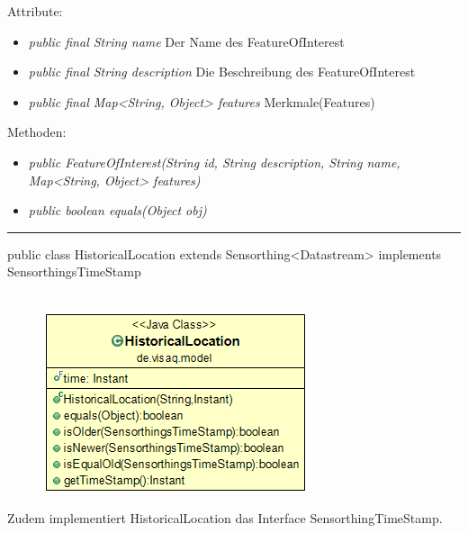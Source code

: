 Attribute:
\begin{itemize} 
	\item \emph{public final String name} Der Name des FeatureOfInterest
	\item \emph{public final String description} Die Beschreibung des FeatureOfInterest
	\item \emph{public final Map<String, Object> features} Merkmale(Features)
\end{itemize}
Methoden:
\begin{itemize} 
	\item \emph{public FeatureOfInterest(String id, String description, String name, Map<String, Object> features)} 
	\item \emph{public boolean equals(Object obj)} 
\end{itemize}

\rule{\textwidth}{0.4pt}
public class HistoricalLocation extends Sensorthing<Datastream> implements SensorthingsTimeStamp
\\\\
\begin{minipage}{0.3\textwidth}
	\begin{figure}[H]
		\includegraphics[scale = 0.5
		]{media/frontend/model/HistoricalLocationClass.png}
	\end{figure}
\end{minipage} \hfill
\begin{minipage}{0.6\textwidth}
	 Zudem implementiert HistoricalLocation das Interface SensorthingTimeStamp.
\end{minipage}

